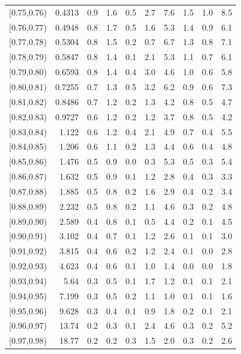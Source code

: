 \begin{table}[t!]
\begin{tabular}{c r c c c c c c c c}
{[0.75,0.76)} & 0.4313 & 0.9 & 1.6 & 0.5 & 2.7 & 7.6 & 1.5 & 1.0 & 8.5 \\
{[0.76,0.77)} & 0.4948 & 0.8 & 1.7 & 0.5 & 1.6 & 5.3 & 1.4 & 0.9 & 6.1 \\
{[0.77,0.78)} & 0.5304 & 0.8 & 1.5 & 0.2 & 0.7 & 6.7 & 1.3 & 0.8 & 7.1 \\
{[0.78,0.79)} & 0.5847 & 0.8 & 1.4 & 0.1 & 2.1 & 5.3 & 1.1 & 0.7 & 6.1 \\
{[0.79,0.80)} & 0.6593 & 0.8 & 1.4 & 0.4 & 3.0 & 4.6 & 1.0 & 0.6 & 5.8 \\
{[0.80,0.81)} & 0.7255 & 0.7 & 1.3 & 0.5 & 3.2 & 6.2 & 0.9 & 0.6 & 7.3 \\
{[0.81,0.82)} & 0.8486 & 0.7 & 1.2 & 0.2 & 1.3 & 4.2 & 0.8 & 0.5 & 4.7 \\
{[0.82,0.83)} & 0.9727 & 0.6 & 1.2 & 0.2 & 1.2 & 3.7 & 0.8 & 0.5 & 4.2 \\
{[0.83,0.84)} & 1.122 & 0.6 & 1.2 & 0.4 & 2.1 & 4.9 & 0.7 & 0.4 & 5.5 \\
{[0.84,0.85)} & 1.206 & 0.6 & 1.1 & 0.2 & 1.3 & 4.4 & 0.6 & 0.4 & 4.8 \\
{[0.85,0.86)} & 1.476 & 0.5 & 0.9 & 0.0 & 0.3 & 5.3 & 0.5 & 0.3 & 5.4 \\
{[0.86,0.87)} & 1.632 & 0.5 & 0.9 & 0.1 & 1.2 & 2.8 & 0.4 & 0.3 & 3.3 \\
{[0.87,0.88)} & 1.885 & 0.5 & 0.8 & 0.2 & 1.6 & 2.9 & 0.4 & 0.2 & 3.4 \\
{[0.88,0.89)} & 2.232 & 0.5 & 0.8 & 0.2 & 1.1 & 4.6 & 0.3 & 0.2 & 4.8 \\
{[0.89,0.90)} & 2.589 & 0.4 & 0.8 & 0.1 & 0.5 & 4.4 & 0.2 & 0.1 & 4.5 \\
{[0.90,0.91)} & 3.102 & 0.4 & 0.7 & 0.1 & 1.2 & 2.6 & 0.1 & 0.1 & 3.0 \\
{[0.91,0.92)} & 3.815 & 0.4 & 0.6 & 0.2 & 1.2 & 2.4 & 0.1 & 0.0 & 2.8 \\
{[0.92,0.93)} & 4.623 & 0.4 & 0.6 & 0.1 & 1.0 & 1.4 & 0.0 & 0.0 & 1.8 \\
{[0.93,0.94)} & 5.64 & 0.3 & 0.5 & 0.1 & 1.7 & 1.2 & 0.1 & 0.1 & 2.1 \\
{[0.94,0.95)} & 7.199 & 0.3 & 0.5 & 0.2 & 1.1 & 1.0 & 0.1 & 0.1 & 1.6 \\
{[0.95,0.96)} & 9.628 & 0.3 & 0.4 & 0.1 & 0.9 & 1.8 & 0.2 & 0.1 & 2.1 \\
{[0.96,0.97)} & 13.74 & 0.2 & 0.3 & 0.1 & 2.4 & 4.6 & 0.3 & 0.2 & 5.2 \\
{[0.97,0.98)} & 18.77 & 0.2 & 0.2 & 0.3 & 1.5 & 2.0 & 0.3 & 0.2 & 2.6 \\

\end{tabular}
\end{table}
